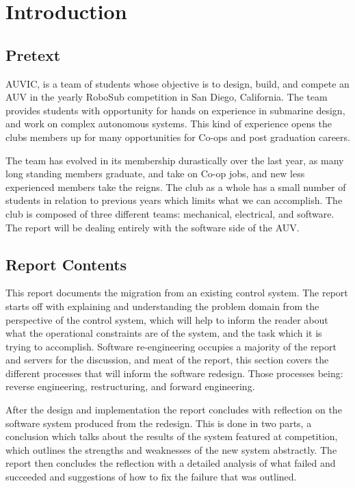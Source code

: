 \chapter{Introduction}

\label{Chapter1}

\section{Pretext}

AUVIC, is a team of students whose objective is to design, build, and compete an
\gls{AUV} in the yearly RoboSub competition in San Diego, California.
The team provides students with opportunity for hands on experience in submarine
design, and work on complex autonomous systems.
This kind of experience opens the clubs members up for many opportunities for
Co-ops and post graduation careers. 

The team has evolved in its membership durastically over the last year, as many
long standing members graduate, and take on Co-op jobs, and new less experienced
members take the reigns.
The club as a whole has a small number of students in relation to previous years
which limits what we can accomplish.
The club is composed of three different teams: mechanical, electrical, and
software.
The report will be dealing entirely with the software side of the AUV.



\section{Report Contents}

This report documents the migration from an existing control system.
The report starts off with explaining and understanding the problem domain from the
perspective of the control system, which will help to inform the reader about
what the operational constraints are of the system, and the task which it is
trying to accomplish.
Software re-engineering occupies a majority of the report and servers for the
discussion, and meat of the report, this section covers the different processes
that will inform the software redesign.
Those processes being: reverse engineering, restructuring, and forward engineering.

After the design and implementation the report concludes with reflection on the
software system produced from the redesign.
This is done in two parts, a conclusion which talks about the results of the
system featured at competition, which outlines the strengths and weaknesses of
the new system abstractly.
The report then concludes the reflection with a detailed analysis of what failed
and succeeded and suggestions of how to fix the failure that was outlined.
